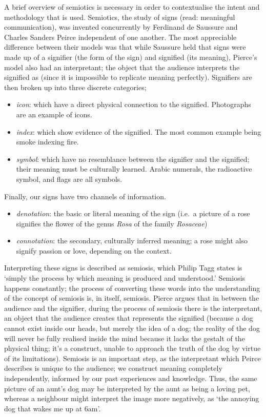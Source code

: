 A brief overview of semiotics is necessary in order to contextualise the intent and methodology that is used.
Semiotics, the study of signs (read: meaningful communication), was invented concurrently by Ferdinand de Saussure and Charles Sanders Peirce independent of one another.
The most appreciable difference between their models was that while Saussure held that signs were made up of a signifier (the form of the sign) and signified (its meaning), Pierce's model also had an interpretant; the object that the audience interprets the signified as (since it is impossible to replicate meaning perfectly).
Signifiers are then broken up into three discrete categories; 
\begin{itemize}
\item \emph{\gls{icon}}: which have a direct physical connection to the signified. Photographs are an example of icons.
\item \emph{\gls{index}}: which show evidence of the signified. The most common example being smoke indexing fire.
\item \emph{\gls{symbol}}: which have no resemblance between the signifier and the signified; their meaning must be culturally learned. Arabic numerals, the radioactive symbol, and flags are all symbols.
\end{itemize}

Finally, our signs have two channels of information.
\begin{itemize}
\item \emph{\gls{denotation}}: the basic or literal meaning of the sign (i.e.\ a picture of a rose signifies the flower of the genus \emph{Rosa} of the family \emph{Rosaceae})
\item \emph{\gls{connotation}}: the secondary, culturally inferred meaning; a rose might also signify passion or love, depending on the context.
\end{itemize}

Interpreting these signs is described as semiosis, which Philip Tagg states is `simply the process by which meaning is produced and understood.'\autocite[156]{taggMusicMeaningsModern2013}
Semiosis happens constantly; the process of converting these words into the understanding of the concept of semiosis is, in itself, semiosis. 
Pierce argues that in between the audience and the signifier, during the process of semiosis there is the interpretant, an object that the audience creates that represents the signified (because a dog cannot exist inside our heads, but merely the idea of a dog; the reality of the dog will never be fully realised inside the mind because it lacks the gestalt of the physical thing; 
it's a construct, unable to approach the truth of the dog by virtue of its limitations).
Semiosis is an important step, as the interpretant which Peirce describes is unique to the audience; we construct meaning completely independently, informed by our past experiences and knowledge.
Thus, the same picture of an aunt's dog may be interpreted by the aunt as being a loving pet, whereas a neighbour might interpret the image more negatively, as `the annoying dog that wakes me up at 6am'.

